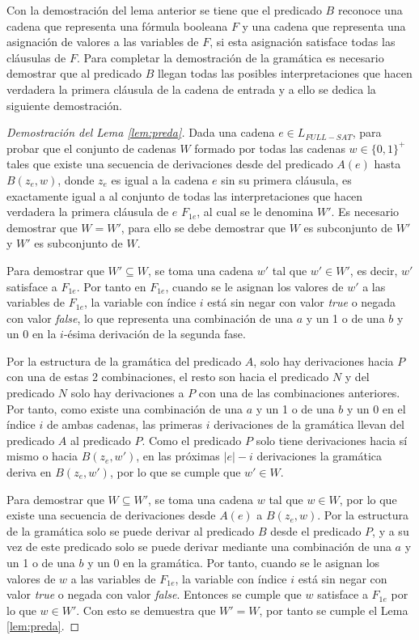 \documentclass[12pt]{article}
\newcommand{\true}{\textit{true}}
\newcommand{\false}{\textit{false}}
\begin{document}
Con la demostración del lema anterior se tiene que el predicado $B$ reconoce una cadena que representa una fórmula booleana $F$
y una cadena que representa una asignación de valores a las variables de $F$, si esta asignación satisface
todas las cláusulas de $F$. Para completar la demostración de la gramática es necesario demostrar
que al predicado $B$ llegan todas las posibles interpretaciones que hacen verdadera la primera cláusula
de la cadena de entrada y a ello se dedica la siguiente demostración.

\begin{proof}[Demostración del Lema \ref{lem:preda}]
    Dada una cadena $e\in L_{FULL-SAT}$, para probar que el conjunto de cadenas $W$ formado por todas las cadenas 
    $w\in \{0,1\}^+$ tales que existe una secuencia de derivaciones desde del predicado $A(e)$ hasta 
    $B(z_e,w)$, donde $z_e$ es igual a la cadena $e$ sin su primera cláusula, es exactamente igual a 
    al conjunto de todas las interpretaciones que hacen verdadera la primera cláusula de $e$ $F_{1e}$, al cual se le denomina $W'$.
    Es necesario demostrar que $W=W'$, para ello se debe demostrar que $W$ es subconjunto de $W'$ y $W'$ es subconjunto de $W$. 
    
    Para demostrar que $W'\subseteq W$, se toma una cadena $w'$ tal que $w'\in W'$, es decir, $w'$ satisface a $F_{1e}$.  Por tanto en $F_{1e}$, cuando se le asignan los valores de $w'$ a las variables de $F_{1e}$, la variable  con índice $i$ está sin negar con valor \true{} o negada con valor \false{}, lo que representa una combinación de una $a$ y un 1 o de una $b$ y un 0 en la $i$-ésima derivación de la segunda fase.
    
    Por la estructura de la gramática del predicado $A$, solo hay derivaciones hacia $P$ con una de estas 2 combinaciones, el resto son hacia el predicado $N$ y del predicado $N$ solo hay derivaciones a $P$ con una de las combinaciones anteriores. Por tanto, como existe una combinación de una $a$ y un 1 o de una $b$ y un 0 en el índice $i$ de ambas cadenas, las primeras $i$ derivaciones de la gramática llevan del predicado $A$ al predicado $P$. Como el predicado $P$ solo tiene derivaciones hacia sí mismo o hacia $B(z_e,w')$, en las próximas $|e|-i$ derivaciones la gramática deriva en $B(z_e,w')$, por lo que se cumple que $w'\in W$.
    
    Para demostrar que $W\subseteq W'$, se toma una cadena $w$ tal que $w\in W$, por lo que existe una secuencia de derivaciones desde $A(e)$ a $B(z_e,w)$. Por la estructura de la gramática solo se puede derivar al predicado $B$ desde el predicado $P$, y a su vez de este predicado solo se puede derivar mediante una combinación de una $a$ y un 1 o de una $b$ y un 0 en la gramática. Por tanto, cuando se le asignan los valores de $w$ a las variables de $F_{1e}$, la variable con índice $i$ está sin negar con valor \true{} o negada con valor \false{}.  Entonces se cumple que $w$ satisface a $F_{1e}$ por lo que $w\in W'$. Con esto se demuestra que $W'=W$, por tanto se cumple el Lema \ref{lem:preda}.
\end{proof}
\end{document}
